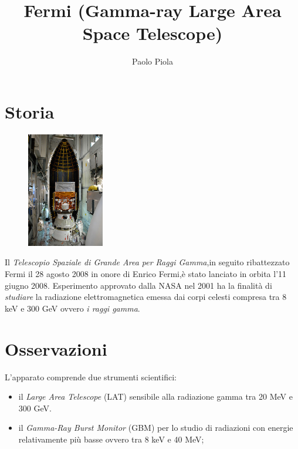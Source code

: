 \documentclass[12pt,a4paper]{article}
\begin{document}
\title{\vspace{-70pt}Fermi (Gamma-ray Large Area Space Telescope)}
\author{Paolo Piola}
\date{}
\maketitle
\pagestyle{empty}
\thispagestyle{empty}

\section*{Storia}
\label{storia}
\begin{figure}
  \vspace{-10pt}
  \begin{center}
    \includegraphics[width=0.30\textwidth]{satellite}
  \end{center}
  \vspace{-20pt}
\end{figure}
Il \emph{Telescopio Spaziale di Grande Area per Raggi Gamma},in seguito ribattezzato Fermi il 28 agosto 2008 in onore di Enrico Fermi,è stato lanciato in orbita l'11 giugno 2008. Esperimento approvato dalla NASA nel 2001 ha la finalità di \emph{studiare} la radiazione elettromagnetica emessa dai corpi celesti compresa tra 8 keV e 300 GeV ovvero \emph{i raggi gamma}.

\section*{Osservazioni}
\label{osservazioni}

L'apparato comprende due strumenti scientifici:

\begin{itemize}
\item il \emph{Large Area Telescope} (LAT) sensibile alla radiazione gamma tra 20 MeV e 300 GeV.

\item il \emph{Gamma-Ray Burst Monitor} (GBM) per lo studio di radiazioni con energie relativamente più basse ovvero tra 8 keV e 40 MeV;

\end{itemize}
\end{document}
